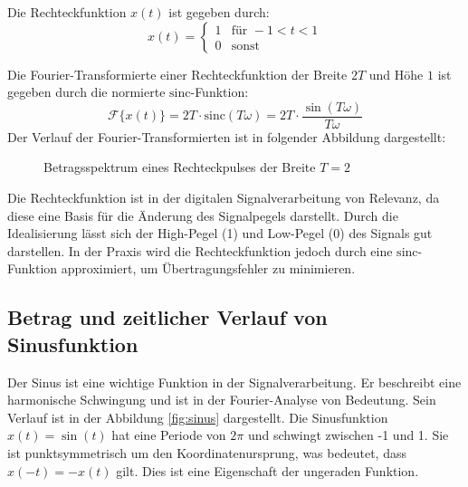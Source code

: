 Die Rechteckfunktion $x(t)$ ist gegeben durch:
\[
x(t) = \begin{cases}
    1 & \text{für } -1 < t < 1 \\
    0 & \text{sonst}
    \end{cases}
\]
    
Die Fourier-Transformierte einer Rechteckfunktion der Breite $2T$ und Höhe $1$ ist gegeben durch die normierte $\mathrm{sinc}$-Funktion:
\[
\mathcal{F}\{x(t)\} = 2T \cdot \mathrm{sinc}(T\omega) = 2T \cdot \frac{\sin(T\omega)}{T\omega}
\]
Der Verlauf der Fourier-Transformierten ist in folgender Abbildung dargestellt:

\begin{figure}[h]
\centering
{}
\caption{Betragsspektrum eines Rechteckpulses der Breite $T = 2$}
\label{fig:fourier_rechteck}
\end{figure}

Die Rechteckfunktion ist in der digitalen Signalverarbeitung von Relevanz, da diese eine Basis für die Änderung des Signalpegels darstellt. Durch die Idealisierung lässt sich der High-Pegel (1) und Low-Pegel (0) des Signals gut darstellen. In der Praxis wird die Rechteckfunktion jedoch durch eine $\mathrm{sinc}$-Funktion approximiert, um Übertragungsfehler zu minimieren.

\subsection{Betrag und zeitlicher Verlauf von Sinusfunktion}
Der Sinus ist eine wichtige Funktion in der Signalverarbeitung.
Er beschreibt eine harmonische Schwingung und ist in der Fourier-Analyse von Bedeutung. Sein Verlauf ist in der Abbildung \ref{fig:sinus} dargestellt.
Die Sinusfunktion $x(t) = \sin(t)$ hat eine Periode von $2\pi$ und schwingt zwischen -1 und 1. Sie ist punktsymmetrisch um den Koordinatenursprung, was bedeutet, dass $x(-t) = -x(t)$ gilt. Dies ist eine Eigenschaft der ungeraden Funktion.

